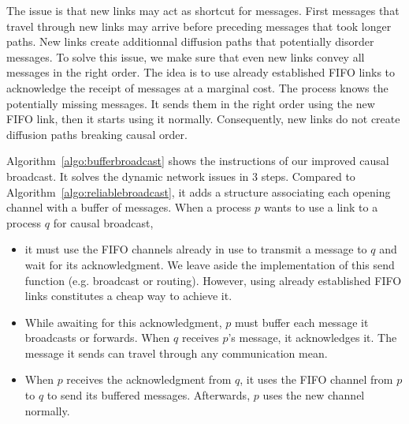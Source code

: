 The issue is that new links may act as shortcut for messages. First messages
that travel through new links may arrive before preceding messages that took
longer paths. New links create additionnal diffusion paths that potentially
disorder messages. To solve this issue, we make sure that even new links convey
all messages in the right order. The idea is to use already established FIFO
links to acknowledge the receipt of messages at a marginal cost. The process
knows the potentially missing messages. It sends them in the right order using
the new FIFO link, then it starts using it normally. Consequently, new links
do not create diffusion paths breaking causal order.




Algorithm~\ref{algo:bufferbroadcast} shows the instructions of our improved
causal broadcast. It solves the dynamic network issues in 3 steps.  Compared to
Algorithm~\ref{algo:reliablebroadcast}, it adds a structure associating each
opening channel with a buffer of messages.  When a process $p$ wants to use a
link to a process $q$ for causal broadcast,
\begin{itemize}[(i)]
\item it must use the FIFO channels already in use to transmit a message to $q$
  and wait for its acknowledgment. We leave aside the implementation of this
  send function (e.g. broadcast or routing). However, using already established
  FIFO links constitutes a cheap way to achieve it.
\item While awaiting for this acknowledgment, $p$ must buffer each message it
  broadcasts or forwards. When $q$ receives $p$'s message, it acknowledges
  it. The message it sends can travel through any communication mean.
\item When $p$ receives the acknowledgment from $q$, it uses the FIFO channel
  from $p$ to $q$ to send its buffered messages. Afterwards, $p$ uses the new
  channel normally.
\end{itemize}

